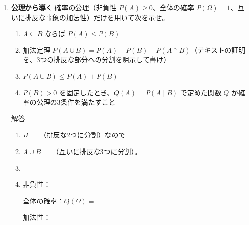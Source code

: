 \documentclass[a4paper,dvipdfmx]{jsarticle}
\newcommand{\提出期限}{2026年11月9日（月）}
\newcommand{\学籍番号}{0000000}
\newcommand{\氏名}{氏名を書く}
\newcommand{\提出日}{2026年11月9日}
\newenvironment{answer}{\begin{itembox}[l]{解答}}{\end{itembox}}
\begin{document}
\begin{enumerate}

  \item \textbf{公理から導く}\quad
    確率の公理（非負性 $P(A) \geq 0$、全体の確率 $P(\Omega) = 1$、互いに排反な事象の加法性）だけを用いて次を示せ。
    \begin{enumerate}
      \item $A \subseteq B$ ならば $P(A) \leq P(B)$
      \item 加法定理 $P(A \cup B) = P(A) + P(B) - P(A \cap B)$（テキストの証明を、3つの排反な部分への分割を明示して書け）
      \item $P(A \cup B) \leq P(A) + P(B)$
      \item $P(B) > 0$ を固定したとき、$Q(A) = P(A \mid B)$ で定めた関数 $Q$ が確率の公理の3条件を満たすこと
    \end{enumerate}
    \begin{answer}
      \begin{enumerate}
        \item $B = $ \phantom{XXXXXXXXXX}（排反な2つに分割）なので
          \vspace{10mm}
        \item $A \cup B = $ \phantom{XXXXXXXXXXXXXXXX}（互いに排反な3つに分割）。
          \vspace{14mm}
        \item
          \vspace{6mm}
        \item 非負性：\phantom{XXXXXXXXXXXX}
          \vspace{2mm}

          全体の確率：$Q(\Omega) = $ \phantom{XXXXXXXXXXXX}
          \vspace{2mm}

          加法性：
          \vspace{12mm}
      \end{enumerate}
    \end{answer}


\end{enumerate}
\end{document}
